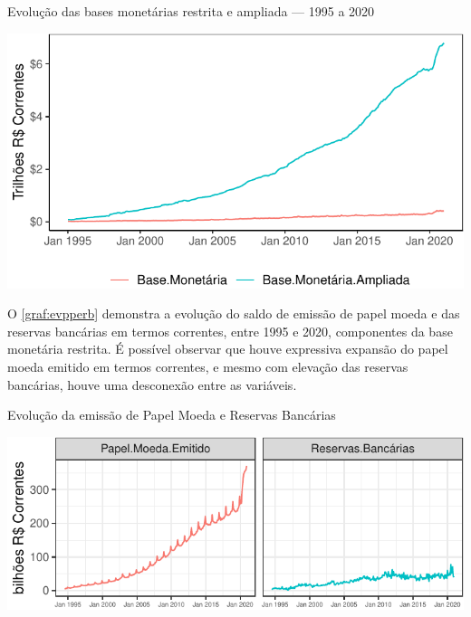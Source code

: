 \documentclass[
  12pt,
  12pt,
  openright,
  oneside,
  a4paper,
  chapter=TITLE,
  section=TITLE,
  subsection=TITLE,
  subsubsection=TITLE,
  english,
  portugues,
  sumario=tradicional]{abntex2}
\begin{document}
\begin{grafico}[!htbp]
\vspace{20pt}
\caption{Evolução das bases monetárias restrita e ampliada — 1995 a 2020}
\vspace{-4mm}

\begin{center}\includegraphics{12-exportedfigures/money.base.d-1} \end{center}
\vspace{-3mm}
\label{graf:moneybases}
\vspace{-2mm}
\end{grafico}

O \autoref{graf:evpperb} demonstra a evolução do saldo de emissão de papel moeda e das reservas bancárias em termos correntes, entre 1995 e 2020, componentes da base monetária restrita. É possível observar que houve expressiva expansão do papel moeda emitido em termos correntes, e mesmo com elevação das reservas bancárias, houve uma desconexão entre as variáveis.

\begin{grafico}[!htbp]
\vspace{20pt}
\caption{Evolução da emissão de Papel Moeda e Reservas Bancárias}
\vspace{-4mm}

\begin{center}\includegraphics{12-exportedfigures/base.moneybase.e-1} \end{center}
\vspace{-3mm}
\label{graf:evpperb}
\vspace{-2mm}
\end{grafico}
\end{document}
